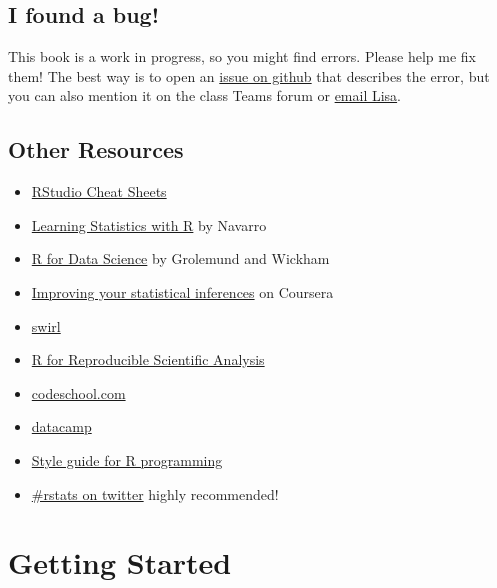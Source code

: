 \documentclass[
  oneside]{book}
\providecommand{\tightlist}{%
  \setlength{\itemsep}{0pt}\setlength{\parskip}{0pt}}
\begin{document}
\hypertarget{i-found-a-bug}{%
\section*{I found a bug!}\label{i-found-a-bug}}

This book is a work in progress, so you might find errors. Please help me fix them! The best way is to open an \href{https://github.com/PsyTeachR/reprores-v2/issues}{issue on github} that describes the error, but you can also mention it on the class Teams forum or \href{mailto:lisa.debruine@glasgow.ac.uk?subject=reprores}{email Lisa}.

\hypertarget{other-resources}{%
\section*{Other Resources}\label{other-resources}}

\begin{itemize}
\tightlist
\item
  \href{https://www.rstudio.com/resources/cheatsheets/}{RStudio Cheat Sheets}
\item
  \href{https://learningstatisticswithr-bookdown.netlify.com}{Learning Statistics with R} by Navarro
\item
  \href{http://r4ds.had.co.nz}{R for Data Science} by Grolemund and Wickham
\item
  \href{https://www.coursera.org/learn/statistical-inferences/}{Improving your statistical inferences} on Coursera
\item
  \href{http://swirlstats.com}{swirl}
\item
  \href{http://swcarpentry.github.io/r-novice-gapminder/}{R for Reproducible Scientific Analysis}
\item
  \href{http://tryr.codeschool.com}{codeschool.com}
\item
  \href{https://www.datacamp.com/courses/free-introduction-to-r}{datacamp}
\item
  \href{http://style.tidyverse.org}{Style guide for R programming}
\item
  \href{https://twitter.com/search?q=\%2523rstats}{\#rstats on twitter} highly recommended!
\end{itemize}

\hypertarget{intro}{%
\chapter{Getting Started}\label{intro}}
\end{document}
